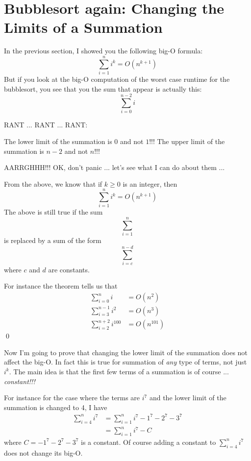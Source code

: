 \section{Bubblesort again: Changing the Limits of a Summation}

In the previous section, I showed you the following big-O formula:
\[
\sum_{i=1}^n i^k = O(n^{k+1})
\]
But if you look at the big-O computation of the worst case runtime
for the bubblesort, you see that you the sum that appear is actually
this:
\[
\sum_{i=0}^{n-2} i
\]

RANT ...  RANT ... RANT:
\begin{itemize}
\li The lower limit of the summation is $0$ and not $1$!!!
\li The upper limit of the summation is $n-2$ and not $n$!!!
\end{itemize}

AARRGHHH!!! OK, don't panic ... let's see what I can do about them ...

\begin{thm} 
From the above, we know that if $k \geq 0$ is an integer, then
\[ \sum_{i=1}^{n} i^k = O(n^{k+1}) \]
The above is still true if the sum 
\[
\sum_{i = 1}^n
\]
is replaced by a sum of the form
\[
\sum_{i = c}^{n - d}
\]
where $c$ and $d$ are constants.
\end{thm}

\begin{eg}
For instance the theorem tells us that 
\begin{align*}
\sum_{i = 0}^{n} i &= O(n^2) \\
\sum_{i = 3}^{n - 1} i^{2} &= O(n^3) \\
\sum_{i = 2}^{n + 2} i^{100} &= O(n^{101})
\end{align*}
\qed
\end{eg}

Now I'm going to prove that changing the lower limit of the summation
does not affect the big-O.
In fact this is true for summation of \textit{any} type of terms, not just $i^k$.
The main idea is that the first few terms of a summation is of course ...
\textit{constant!!!}

For instance for the case where the terms are $i^7$ and the lower
limit of the summation is changed to 4, I have
\begin{align*}
\sum_{i = 4}^n i^7 
&= \sum_{i=1}^n i^7 - 1^7 - 2^7 - 3^7 \\
&= \sum_{i=1}^n i^7 - C
\end{align*}
where $C = - 1^7 - 2^7 - 3^7$ is a constant.
Of course adding a constant to
$\sum_{i = 4}^n i^7$
does not change its big-O.

